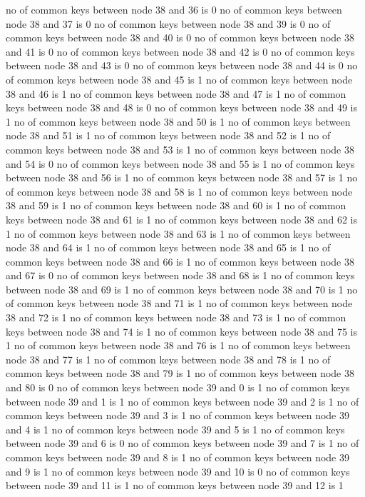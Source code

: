 no of common keys between node 38 and 36 is 0
no of common keys between node 38 and 37 is 0
no of common keys between node 38 and 39 is 0
no of common keys between node 38 and 40 is 0
no of common keys between node 38 and 41 is 0
no of common keys between node 38 and 42 is 0
no of common keys between node 38 and 43 is 0
no of common keys between node 38 and 44 is 0
no of common keys between node 38 and 45 is 1
no of common keys between node 38 and 46 is 1
no of common keys between node 38 and 47 is 1
no of common keys between node 38 and 48 is 0
no of common keys between node 38 and 49 is 1
no of common keys between node 38 and 50 is 1
no of common keys between node 38 and 51 is 1
no of common keys between node 38 and 52 is 1
no of common keys between node 38 and 53 is 1
no of common keys between node 38 and 54 is 0
no of common keys between node 38 and 55 is 1
no of common keys between node 38 and 56 is 1
no of common keys between node 38 and 57 is 1
no of common keys between node 38 and 58 is 1
no of common keys between node 38 and 59 is 1
no of common keys between node 38 and 60 is 1
no of common keys between node 38 and 61 is 1
no of common keys between node 38 and 62 is 1
no of common keys between node 38 and 63 is 1
no of common keys between node 38 and 64 is 1
no of common keys between node 38 and 65 is 1
no of common keys between node 38 and 66 is 1
no of common keys between node 38 and 67 is 0
no of common keys between node 38 and 68 is 1
no of common keys between node 38 and 69 is 1
no of common keys between node 38 and 70 is 1
no of common keys between node 38 and 71 is 1
no of common keys between node 38 and 72 is 1
no of common keys between node 38 and 73 is 1
no of common keys between node 38 and 74 is 1
no of common keys between node 38 and 75 is 1
no of common keys between node 38 and 76 is 1
no of common keys between node 38 and 77 is 1
no of common keys between node 38 and 78 is 1
no of common keys between node 38 and 79 is 1
no of common keys between node 38 and 80 is 0
no of common keys between node 39 and 0 is 1
no of common keys between node 39 and 1 is 1
no of common keys between node 39 and 2 is 1
no of common keys between node 39 and 3 is 1
no of common keys between node 39 and 4 is 1
no of common keys between node 39 and 5 is 1
no of common keys between node 39 and 6 is 0
no of common keys between node 39 and 7 is 1
no of common keys between node 39 and 8 is 1
no of common keys between node 39 and 9 is 1
no of common keys between node 39 and 10 is 0
no of common keys between node 39 and 11 is 1
no of common keys between node 39 and 12 is 1
